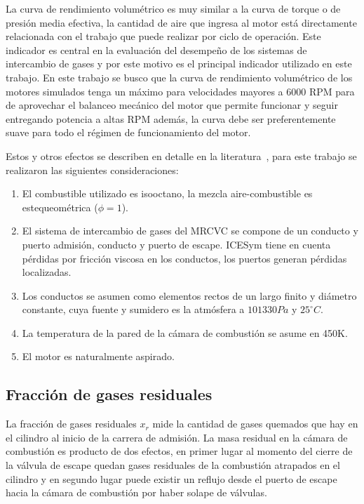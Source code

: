 La curva de rendimiento volumétrico es muy similar a la curva de torque o de
presión media efectiva, la cantidad de aire que ingresa al motor está
directamente relacionada con el trabajo que puede realizar por ciclo de
operación.
%
Este indicador es central en la evaluación del desempeño de los sistemas de
intercambio de gases y por este motivo es el principal indicador utilizado en
este trabajo.
%
En este trabajo se busco que la curva de rendimiento volumétrico de los motores
simulados tenga un máximo para velocidades mayores a 6000 RPM para de aprovechar
el balanceo mecánico del motor que permite funcionar y seguir entregando
potencia a altas RPM además, la curva debe ser preferentemente suave para todo
el régimen de funcionamiento del motor.

Estos y otros efectos se describen en detalle en la
literatura~\parencite{heywood}, para este trabajo se realizaron las siguientes
consideraciones:

\begin{enumerate}
    \item El combustible utilizado es isooctano, la mezcla aire-combustible es
estequeométrica ($\phi=1$).
    \item El sistema de intercambio de gases del MRCVC se compone de un conducto
y puerto admisión, conducto y puerto de escape.
        ICESym tiene en cuenta pérdidas por fricción viscosa en los conductos,
los puertos generan pérdidas localizadas.
    \item Los conductos se asumen como elementos rectos de un largo finito y
diámetro constante, cuya fuente y sumidero es la atmósfera a $101330 Pa$ y
$25^{\circ}C$.
    \item La temperatura de la pared de la cámara de combustión se asume en
450K.
    \item El motor es naturalmente aspirado.
\end{enumerate}

\subsection{Fracción de gases residuales}
%
La fracción de gases residuales $x_r$ mide la cantidad de gases quemados que hay
en el cilindro al inicio de la carrera de admisión.
%
La masa residual en la cámara de combustión es producto de dos efectos, en
primer lugar al momento del cierre de la válvula de escape quedan gases
residuales de la combustión atrapados en el cilindro y en segundo lugar puede
existir un reflujo desde el puerto de escape hacia la cámara de combustión por
haber solape de válvulas.

